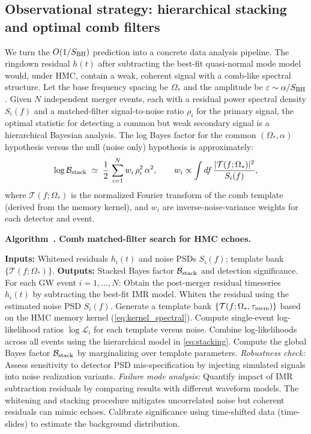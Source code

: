 \documentclass[aps,prd,preprint,onecolumn,superscriptaddress,nofootinbib,longbibliography,floatfix,11pt,showpacs,showkeys]{revtex4-2}
\newcommand{\HMC}{\textsc{HMC}\xspace}
\newcounter{algorithm}
\newcommand{\algcaptionname}{Algorithm}
\newcommand{\hmcalgOldCaption}{}
\newenvironment{algorithm}[1][]{%
  \refstepcounter{algorithm}%
  \begin{infobox}%
  \let\hmcalgOldCaption\caption
  \renewcommand{\caption}[1]{\noindent\textbf{\algcaptionname~\thealgorithm. ##1}\\[0.6ex]}%
}{%
  \par\vspace{-0.4\baselineskip}%
  \let\caption\hmcalgOldCaption
  \end{infobox}%
}
\theoremstyle{plain}
\theoremstyle{definition}
\theoremstyle{remark}
\begin{document}
\subsection{Observational strategy: hierarchical stacking and optimal comb filters}
\label{ssec:obs}
We turn the $O(1/S_{\rm BH})$ prediction into a concrete data analysis pipeline. The ringdown residual $h(t)$ after subtracting the best-fit quasi-normal mode model would, under \HMC{}, contain a weak, coherent signal with a comb-like spectral structure. Let the base frequency spacing be $\Omega_\ast$ and the amplitude be $\varepsilon\sim \alpha/S_{\rm BH}$. Given $N$ independent merger events, each with a residual power spectral density $S_i(f)$ and a matched-filter signal-to-noise ratio $\rho_i$ for the primary signal, the optimal statistic for detecting a common but weak secondary signal is a hierarchical Bayesian analysis. The log Bayes factor for the common $(\Omega_\ast,\alpha)$ hypothesis versus the null (noise only) hypothesis is approximately:
\begin{equation}
\log \mathcal{B}_{\rm stack}\;\simeq\; \frac{1}{2}\,\sum_{i=1}^N w_i\, \rho_i^2\,\alpha^2,
\qquad
w_i \propto \int df\,\frac{|\mathcal{T}(f;\Omega_\ast)|^2}{S_i(f)},
\label{eq:stacking}
\end{equation}
where $\mathcal{T}(f;\Omega_\ast)$ is the normalized Fourier transform of the comb template (derived from the memory kernel), and $w_i$ are inverse-noise-variance weights for each detector and event.

\begin{algorithm}[t!]
\caption{Comb matched-filter search for \HMC{} echoes.}
\label{alg:combfilter}
\begin{algorithmic}[1]
\State \textbf{Inputs:} Whitened residuals $h_i(t)$ and noise PSDs $S_i(f)$; template bank $\{\mathcal{T}(f;\Omega_\ast)\}$.
\State \textbf{Outputs:} Stacked Bayes factor $\mathcal{B}_{\rm stack}$ and detection significance.
\State For each GW event $i=1,\dots,N$:
\State \quad Obtain the post-merger residual timeseries $h_i(t)$ by subtracting the best-fit IMR model.
\State \quad Whiten the residual using the estimated noise PSD $S_i(f)$.
\State \quad Generate a template bank $\{\mathcal{T}(f;\Omega_\ast, \tau_{\rm mem})\}$ based on the \HMC{} memory kernel (\eqref{eq:kernel_spectral}).
\State \quad Compute single-event log-likelihood ratios $\log\mathcal{L}_i$ for each template versus noise.
\State Combine log-likelihoods across all events using the hierarchical model in \eqref{eq:stacking}.
\State Compute the global Bayes factor $\mathcal{B}_{\rm stack}$ by marginalizing over template parameters.
\State \quad \textit{Robustness check:} Assess sensitivity to detector PSD mis-specification by injecting simulated signals into noise realization variants.
\State \quad \textit{Failure mode analysis:} Quantify impact of IMR subtraction residuals by comparing results with different waveform models. The whitening and stacking procedure mitigates uncorrelated noise but coherent residuals can mimic echoes.
\State Calibrate significance using time-shifted data (time-slides) to estimate the background distribution.
\end{algorithmic}
\end{algorithm}
\end{document}
